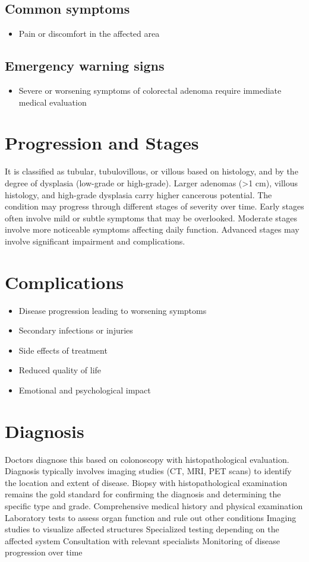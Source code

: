 \subsection{Common symptoms}
\begin{itemize}[noitemsep]
  \item Pain or discomfort in the affected area
  \end{itemize}

\subsection{Emergency warning signs}
\begin{itemize}[noitemsep]
  \item Severe or worsening symptoms of colorectal adenoma require immediate medical evaluation
\end{itemize}
\section{Progression and Stages}
It is classified as tubular, tubulovillous, or villous based on histology, and by the degree of dysplasia (low-grade or high-grade). Larger adenomas (>1 cm), villous histology, and high-grade dysplasia carry higher cancerous potential. The condition may progress through different stages of severity over time. Early stages often involve mild or subtle symptoms that may be overlooked. Moderate stages involve more noticeable symptoms affecting daily function. Advanced stages may involve significant impairment and complications.
\section{Complications}
\begin{itemize}[noitemsep]
  \item Disease progression leading to worsening symptoms
  \item Secondary infections or injuries
  \item Side effects of treatment
  \item Reduced quality of life
  \item Emotional and psychological impact
\end{itemize}
\section{Diagnosis}
Doctors diagnose this based on colonoscopy with histopathological evaluation. Diagnosis typically involves imaging studies (CT, MRI, PET scans) to identify the location and extent of disease. Biopsy with histopathological examination remains the gold standard for confirming the diagnosis and determining the specific type and grade. Comprehensive medical history and physical examination Laboratory tests to assess organ function and rule out other conditions Imaging studies to visualize affected structures Specialized testing depending on the affected system Consultation with relevant specialists Monitoring of disease progression over time

